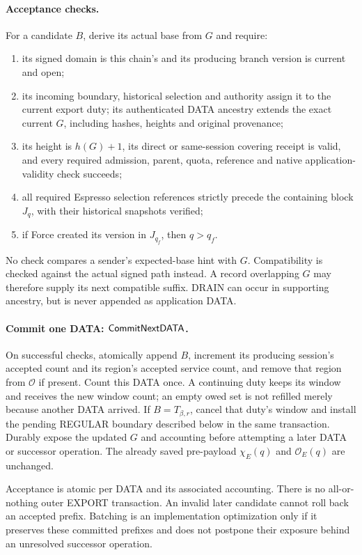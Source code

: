 \paragraph{Acceptance checks.}
For a candidate $B$, derive its actual base from $G$ and require:
\begin{enumerate}[label=(\roman*),itemsep=2pt]
\item its signed domain is this chain's and its producing branch
version is current and open;
\item its incoming boundary, historical selection and authority assign
it to the current export duty; its authenticated DATA ancestry extends
the exact current $G$, including hashes, heights and original provenance;
\item its height is $h(G)+1$, its direct or same-session covering
receipt is valid, and every required admission, parent, quota, reference
and native application-validity check succeeds;
\item all required Espresso selection references strictly precede
the containing block $J_q$, with their historical snapshots verified;
\item if Force created its version in $J_{q_f}$, then $q>q_f$.
\end{enumerate}
No check compares a sender's expected-base hint with $G$. Compatibility
is checked against the actual signed path instead. A record overlapping
$G$ may therefore supply its next compatible suffix. DRAIN can occur in
supporting ancestry, but is never appended as application DATA.

\paragraph{Commit one DATA: $\mathsf{CommitNextDATA}$.}
On successful checks, atomically append $B$, increment its producing
session's accepted count and its region's accepted service count, and
remove that region from $\mathcal O$ if present. Count this DATA once.
A continuing duty keeps its window and receives the new window count;
an empty owed set is not refilled merely because another DATA arrived.
If $B=T_{\beta,r}$, cancel that duty's window and install the pending
REGULAR boundary described below in the same transaction. Durably expose
the updated $G$ and accounting before attempting a later DATA or
successor operation. The already saved pre-payload $\chi_E(q)$ and
$\mathcal O_E(q)$ are unchanged.

Acceptance is atomic per DATA and its associated accounting. There is
no all-or-nothing outer EXPORT transaction. An invalid later candidate
cannot roll back an accepted prefix. Batching is an implementation
optimization only if it preserves these committed prefixes and does
not postpone their exposure behind an unresolved successor operation.

